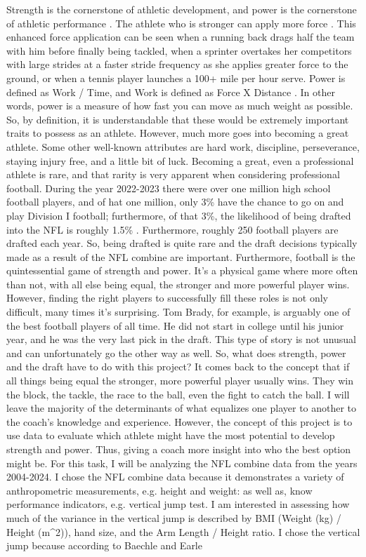\documentclass[12pt]{article}
\begin{document}
Strength is the cornerstone of athletic development, and power is the cornerstone of athletic performance \parencite{haff2016essentials}. The athlete who is stronger can apply more force \parencite[49]{kraemer2005strength}. This enhanced force application can be seen when a running back drags half the team with him before finally being tackled, when a sprinter overtakes her competitors with large strides at a faster stride frequency as she applies greater force to the ground, or when a tennis player launches a 100+ mile per hour serve. Power is defined as Work / Time, and Work is defined as Force X Distance \parencite[74]{baechle2008essentials}. In other words, power is a measure of how fast you can move as much weight as possible. So, by definition, it is understandable that these would be extremely important traits to possess as an athlete. However, much more goes into becoming a great athlete. Some other well-known attributes are hard work, discipline, perseverance, staying injury free, and a little bit of luck. Becoming a great, even a professional athlete is rare, and that rarity is very apparent when considering professional football. During the year 2022-2023 there were over one million high school football players, and of hat one million, only 3\% have the chance to go on and play Division I football; furthermore, of that 3\%, the likelihood of being drafted into the NFL is roughly 1.5\% \parencite{ncaa2024}. Furthermore, roughly 250 football players are drafted each year. So, being drafted is quite rare and the draft decisions typically made as a result of the NFL combine are important. Furthermore, football is the quintessential game of strength and power. It's a physical game where more often than not, with all else being equal, the stronger and more powerful player wins. However, finding the right players to successfully fill these roles is not only difficult, many times it's surprising. Tom Brady, for example, is arguably one of the best football players of all time. He did not start in college until his junior year, and he was the very last pick in the draft. This type of story is not unusual and can unfortunately go the other way as well. So, what does strength, power and the draft have to do with this project? It comes back to the concept that if all things being equal the stronger, more powerful player usually wins. They win the block, the tackle, the race to the ball, even the fight to catch the ball. I will leave the majority of the determinants of what equalizes one player to another to the coach's knowledge and experience. However, the concept of this project is to use data to evaluate which athlete might have the most potential to develop strength and power. Thus, giving a coach more insight into who the best option might be. For this task, I will be analyzing the NFL combine data from the years 2004-2024. I chose the NFL combine data because it demonstrates a variety of anthropometric measurements, e.g. height and weight: as well as, know performance indicators, e.g. vertical jump test. I am interested in assessing how much of the variance in the vertical jump is described by BMI (Weight (kg) / Height (m\^{}2)), hand size, and the Arm Length / Height ratio. I chose the vertical jump because according to Baechle and Earle 
\end{document}
